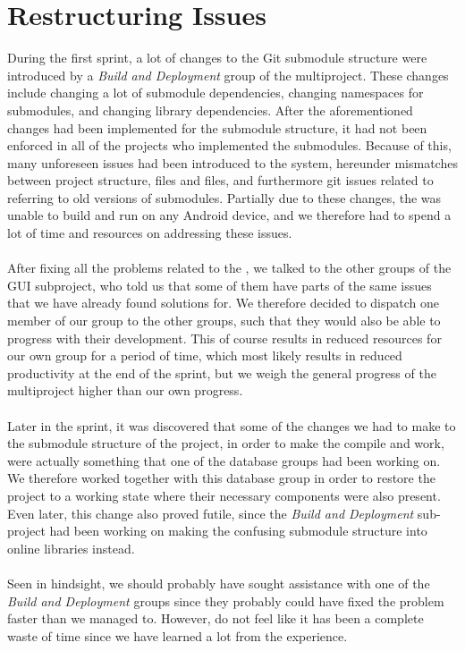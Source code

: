 \section{Restructuring Issues}
\label{sec:restructuring_issues}

During the first sprint, a lot of changes to the Git submodule structure were introduced by a \emph{Build and Deployment} group of the multiproject. These changes include changing a lot of submodule dependencies, changing namespaces for submodules, and changing library dependencies. After the aforementioned changes had been implemented for the submodule structure, it had not been enforced in all of the \giraf projects who implemented the submodules. Because of this, many unforeseen issues had been introduced to the system, hereunder mismatches between project structure,  files and  files, and furthermore git issues related to referring to old versions of submodules. Partially due to these changes, the \ct was unable to build and run on any Android device, and we therefore had to spend a lot of time and resources on addressing these issues. 
\\\\
After fixing all the problems related to the \ct, we talked to the other groups of the GUI subproject, who told us that some of them have parts of the same issues that we have already found solutions for. We therefore decided to dispatch one member of our group to the other groups, such that they would also be able to progress with their development. This of course results in reduced resources for our own group for a period of time, which most likely results in reduced productivity at the end of the sprint, but we weigh the general progress of the multiproject higher than our own progress.
\\\\
Later in the sprint, it was discovered that some of the changes we had to make to the submodule structure of the project, in order to make the \ct compile and work, were actually something that one of the database groups had been working on. We therefore worked together with this database group in order to restore the project to a working state where their necessary components were also present. Even later, this change also proved futile, since the \emph{Build and Deployment} sub-project had been working on making the confusing submodule structure into online libraries instead. 
\\\\
Seen in hindsight, we should probably have sought assistance with one of the \emph{Build and Deployment} groups since they probably could have fixed the problem faster than we managed to. However, do not feel like it has been a complete waste of time since we have learned a lot from the experience.
